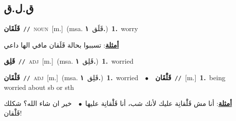 \documentclass[10pt,a4paper,twoside]{article} %
\begin{document}
\begin{multicols}{2}
\vspace{-3mm}
\subsection*{\color{blue}\foreignlanguage{arabic}{ق.ل.ق}\color{blue}{}} 

{\setlength\topsep{0pt}\textbf{\foreignlanguage{arabic}{قَلَقَان}}\ {\color{gray}\texttt{//}\color{black}}\ \textsc{noun}\ [m.]\ \color{gray}(msa. \foreignlanguage{arabic}{قَلَق}~\foreignlanguage{arabic}{\textbf{١.}})\color{black}\ \textbf{1.}~worry\  \begin{flushright}\color{gray}\foreignlanguage{arabic}{\textbf{\underline{\foreignlanguage{arabic}{أمثلة}}}: تسببوا بحالة قَلَقان مافي الها داعي}\end{flushright}\color{black}} \vspace{2mm}

{\setlength\topsep{0pt}\textbf{\foreignlanguage{arabic}{قَلِق}}\ {\color{gray}\texttt{//}\color{black}}\ \textsc{adj}\ [m.]\ \color{gray}(msa. \foreignlanguage{arabic}{قَلِق}~\foreignlanguage{arabic}{\textbf{١.}})\color{black}\ \textbf{1.}~worried\ } \vspace{2mm}

{\setlength\topsep{0pt}\textbf{\foreignlanguage{arabic}{قَلْقَان}}\ {\color{gray}\texttt{//}\color{black}}\ \textsc{adj}\ [m.]\ \color{gray}(msa. \foreignlanguage{arabic}{قَلِق}~\foreignlanguage{arabic}{\textbf{١.}})\color{black}\ \textbf{1.}~worried\ \ $\bullet$\ \ \setlength\topsep{0pt}\textbf{\foreignlanguage{arabic}{قَلَْقَان}}\ {\color{gray}\texttt{//}\color{black}}\ [m.]\ \textbf{1.}~being worried about sb or sth\  \begin{flushright}\color{gray}\foreignlanguage{arabic}{\textbf{\underline{\foreignlanguage{arabic}{أمثلة}}}: أنا مش قَلَْقانِة عليك لأنك شب، أنا قَلَْقانِة عليها\ $\bullet$\ \  خير ان شاء الله؟ شكلك قَلَْقان!}\end{flushright}\color{black}} \vspace{2mm}


\end{multicols}
\end{document}
